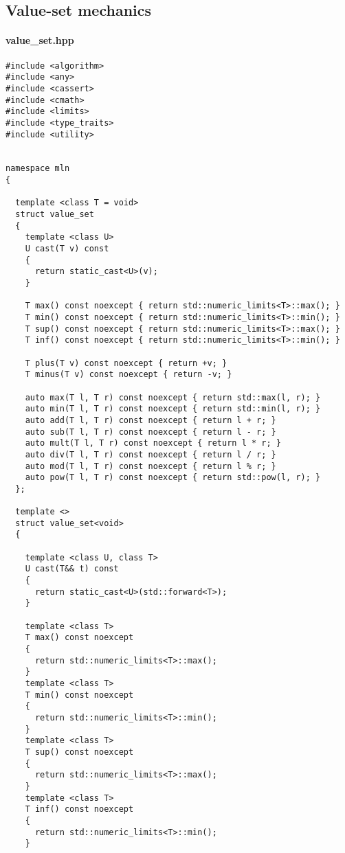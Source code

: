 \subsection{Value-set mechanics}
\label{appendix:static-dynamic-bridge.mm.vs}

\paragraph{value\_set.hpp}
\label{appendix:static-dynamic-bridge.mm.vs.value_set.hpp}

\begin{verbatim}
#include <algorithm>
#include <any>
#include <cassert>
#include <cmath>
#include <limits>
#include <type_traits>
#include <utility>


namespace mln
{

  template <class T = void>
  struct value_set
  {
    template <class U>
    U cast(T v) const
    {
      return static_cast<U>(v);
    }

    T max() const noexcept { return std::numeric_limits<T>::max(); }
    T min() const noexcept { return std::numeric_limits<T>::min(); }
    T sup() const noexcept { return std::numeric_limits<T>::max(); }
    T inf() const noexcept { return std::numeric_limits<T>::min(); }

    T plus(T v) const noexcept { return +v; }
    T minus(T v) const noexcept { return -v; }

    auto max(T l, T r) const noexcept { return std::max(l, r); }
    auto min(T l, T r) const noexcept { return std::min(l, r); }
    auto add(T l, T r) const noexcept { return l + r; }
    auto sub(T l, T r) const noexcept { return l - r; }
    auto mult(T l, T r) const noexcept { return l * r; }
    auto div(T l, T r) const noexcept { return l / r; }
    auto mod(T l, T r) const noexcept { return l % r; }
    auto pow(T l, T r) const noexcept { return std::pow(l, r); }
  };

  template <>
  struct value_set<void>
  {

    template <class U, class T>
    U cast(T&& t) const
    {
      return static_cast<U>(std::forward<T>);
    }

    template <class T>
    T max() const noexcept
    {
      return std::numeric_limits<T>::max();
    }
    template <class T>
    T min() const noexcept
    {
      return std::numeric_limits<T>::min();
    }
    template <class T>
    T sup() const noexcept
    {
      return std::numeric_limits<T>::max();
    }
    template <class T>
    T inf() const noexcept
    {
      return std::numeric_limits<T>::min();
    }


\end{verbatim}
